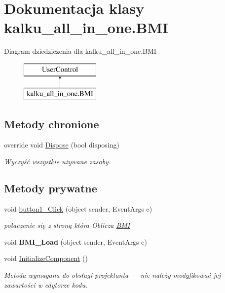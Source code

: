 \hypertarget{classkalku__all__in__one_1_1_b_m_i}{}\section{Dokumentacja klasy kalku\+\_\+all\+\_\+in\+\_\+one.\+B\+MI}
\label{classkalku__all__in__one_1_1_b_m_i}
Diagram dziedziczenia dla kalku\+\_\+all\+\_\+in\+\_\+one.\+B\+MI\begin{figure}[H]
\begin{center}
\leavevmode
\includegraphics[height=2.000000cm]{classkalku__all__in__one_1_1_b_m_i}
\end{center}
\end{figure}
\subsection*{Metody chronione}
\begin{DoxyCompactItemize}
\item 
override void \mbox{\hyperlink{classkalku__all__in__one_1_1_b_m_i_a1264455b68083a34b6c3e7e32198052d}{Dispose}} (bool disposing)
\begin{DoxyCompactList}\small\item\em Wyczyść wszystkie używane zasoby. \end{DoxyCompactList}\end{DoxyCompactItemize}
\subsection*{Metody prywatne}
\begin{DoxyCompactItemize}
\item 
\mbox{\label{classkalku__all__in__one_1_1_b_m_i_aee12fde7bff6e9d16af5610e4d4bd999}} 
void \mbox{\hyperlink{classkalku__all__in__one_1_1_b_m_i_aee12fde7bff6e9d16af5610e4d4bd999}{button1\+\_\+\+Click}} (object sender, Event\+Args e)
\begin{DoxyCompactList}\small\item\em połaczenie się z stroną która Oblicza \mbox{\hyperlink{classkalku__all__in__one_1_1_b_m_i}{B\+MI}} \end{DoxyCompactList}\item 
\mbox{\label{classkalku__all__in__one_1_1_b_m_i_a457377aab5a4005972d512e5cf995278}} 
void {\bfseries B\+M\+I\+\_\+\+Load} (object sender, Event\+Args e)
\item 
void \mbox{\hyperlink{classkalku__all__in__one_1_1_b_m_i_a02a0303e6c69bd4c1913bffeabb80f70}{Initialize\+Component}} ()
\begin{DoxyCompactList}\small\item\em Metoda wymagana do obsługi projektanta — nie należy modyfikować jej zawartości w edytorze kodu. \end{DoxyCompactList}\end{DoxyCompactItemize}
